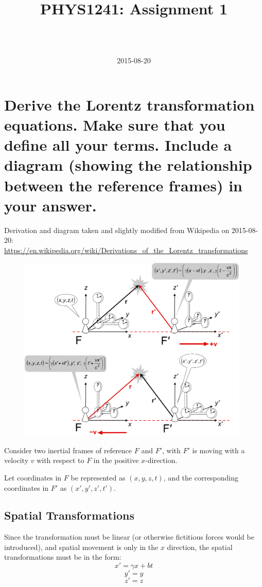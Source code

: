 \documentclass[a4paper]{scrartcl}
\begin{document}
\title{PHYS1241: Assignment 1}
\author{ \\ \\ }
\date{2015-08-20}
\maketitle

\section{Derive the Lorentz transformation equations. Make sure that you define all your terms. Include a diagram (showing the relationship between the reference frames) in your answer.}
Derivation and diagram taken and slightly modified from Wikipedia on 2015-08-20: \\ \url{https://en.wikipedia.org/wiki/Derivations_of_the_Lorentz_transformations}

\begin{figure}\includegraphics[width = 11cm]{ass1_lorentz_transforms.png}\end{figure}

Consider two inertial frames of reference \(F\) and \(F'\), with \(F'\) is moving with a velocity \(v\) with respect to \(F\) in the positive \(x\)-direction.

Let coordinates in \(F\) be represented as \((x, y, z, t)\), and the corresponding coordinates in \(F'\) as \((x', y', z', t')\).

\subsection{Spatial Transformations}
Since the transformation must be linear (or otherwise fictitious forces would be introduced), and spatial movement is only in the \(x\) direction, the spatial transformations must be in the form:
\[x' = \gamma x + bt\]
\[y' = y\]
\[z' = z\]
\end{document}
